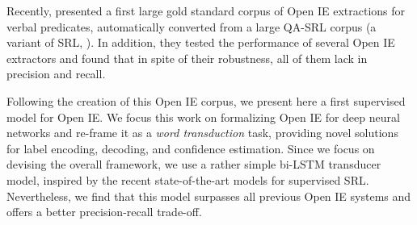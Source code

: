 Recently, \citet{Stanovsky2016EMNLP} %
presented a first large gold standard corpus of Open IE extractions for verbal predicates, automatically converted from a large QA-SRL corpus (a variant of SRL, \cite{hequestion}).
In addition, they tested the performance of several Open IE extractors and found that
in spite of their robustness,
all of them lack in precision and recall.

Following the creation of this Open IE corpus,
we present here a first supervised model for Open IE.
We focus this work on formalizing Open IE for deep neural networks and re-frame it as a \emph{word transduction} task, providing novel solutions for label encoding, decoding,
and confidence estimation.
Since we focus on devising the overall framework, we use a rather simple bi-LSTM transducer model,
inspired by the recent state-of-the-art models for supervised SRL.
Nevertheless, we find that this model surpasses all previous Open IE systems and
offers a better precision-recall trade-off.


